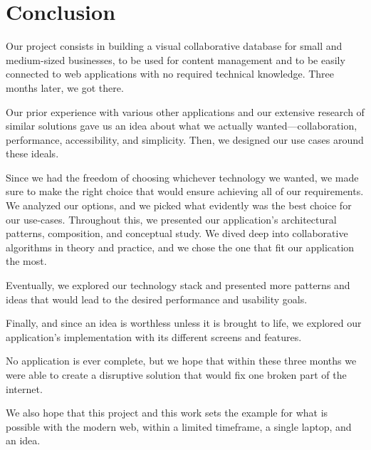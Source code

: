 \chapter*{Conclusion}

Our project consists in building a visual collaborative database for small and medium-sized businesses, to be used for content management and to be easily connected to web applications with no required technical knowledge. Three months later, we got there.

Our prior experience with various other applications and our extensive research of similar solutions gave us an idea about what we actually wanted---collaboration, performance, accessibility, and simplicity.
Then, we designed our use cases around these ideals.

Since we had the freedom of choosing whichever technology we wanted, we made sure to make the right choice that would ensure achieving all of our requirements.
We analyzed our options, and we picked what evidently was the best choice for our use-cases.
Throughout this, we presented our application's architectural patterns, composition, and conceptual study.
We dived deep into collaborative algorithms in theory and practice, and we chose the one that fit our application the most.

Eventually, we explored our technology stack and presented more patterns and ideas that would lead to the desired performance and usability goals.

Finally, and since an idea is worthless unless it is brought to life, we explored our application's implementation with its different screens and features.

No application is ever complete, but we hope that within these three months we were able to create a disruptive solution that would fix one broken part of the internet.

We also hope that this project and this work sets the example for what is possible with the modern web, within a limited timeframe, a single laptop, and an idea.